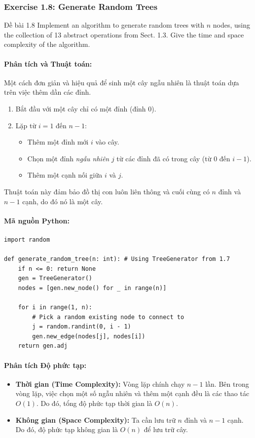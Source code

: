 \documentclass[a4paper,12pt]{article}
\begin{document}
\subsubsection{Exercise 1.8: Generate Random Trees}
\begin{problembox}{Đề bài 1.8}
    Implement an algorithm to generate random trees with $n$ nodes, using the collection of 13 abstract operations from Sect. 1.3. Give the time and space complexity of the algorithm.
\end{problembox}
\paragraph{Phân tích và Thuật toán:}
Một cách đơn giản và hiệu quả để sinh một cây ngẫu nhiên là thuật toán dựa trên việc thêm dần các đỉnh.
\begin{enumerate}
    \item Bắt đầu với một cây chỉ có một đỉnh (đỉnh 0).
    \item Lặp từ $i=1$ đến $n-1$:
        \begin{itemize}
            \item Thêm một đỉnh mới $i$ vào cây.
            \item Chọn một đỉnh \textit{ngẫu nhiên} $j$ từ các đỉnh đã có trong cây (từ $0$ đến $i-1$).
            \item Thêm một cạnh nối giữa $i$ và $j$.
        \end{itemize}
\end{enumerate}
Thuật toán này đảm bảo đồ thị con luôn liên thông và cuối cùng có $n$ đỉnh và $n-1$ cạnh, do đó nó là một cây.

\paragraph{Mã nguồn Python:}
\begin{lstlisting}[style=pythonstyle, caption={Sinh cây ngẫu nhiên.}]
import random

def generate_random_tree(n: int): # Using TreeGenerator from 1.7
    if n <= 0: return None
    gen = TreeGenerator()
    nodes = [gen.new_node() for _ in range(n)]
    
    for i in range(1, n):
        # Pick a random existing node to connect to
        j = random.randint(0, i - 1)
        gen.new_edge(nodes[j], nodes[i])
    return gen.adj
\end{lstlisting}

\paragraph{Phân tích Độ phức tạp:}
\begin{itemize}
    \item \textbf{Thời gian (Time Complexity):} Vòng lặp chính chạy $n-1$ lần. Bên trong vòng lặp, việc chọn một số ngẫu nhiên và thêm một cạnh đều là các thao tác $O(1)$. Do đó, tổng độ phức tạp thời gian là $O(n)$.
    \item \textbf{Không gian (Space Complexity):} Ta cần lưu trữ $n$ đỉnh và $n-1$ cạnh. Do đó, độ phức tạp không gian là $O(n)$ để lưu trữ cây.
\end{itemize}
\end{document}
